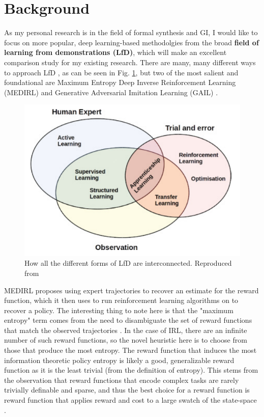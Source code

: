 \section{Background}

As my personal research is in the field of formal synthesis and GI, I would like to focus on more popular, deep learning-based methodolgies from the broad \textbf{field of learning from demonstrations (LfD)}, which will make an excellent comparison study for my existing research. There are many, many different ways to approach LfD \cite{Ravichandar2020}, as can be seen in Fig. \ref{fig: lfd_venn}, but two of the most salient and foundational are Maximum Entropy Deep Inverse Reinforcement Learning (MEDIRL) \cite{Wulfmeier2015MaximumED} and Generative Adversarial Imitation Learning (GAIL) \cite{Ho2016GenerativeAI}.

\begin{figure}[htbp]
\centerline{\includegraphics[width=\linewidth]{Figures/lfd_venn_diagram.png}}
\caption{How all the different forms of LfD are interconnected. Reproduced from \cite{Hussein2017}}
\label{fig: lfd_venn}
\end{figure}

MEDIRL proposes using expert trajectories to recover an estimate for the reward function, which it then uses to run reinforcement learning algorithms on to recover a policy. The interesting thing to note here is that the "maximum entropy" term comes from the need to disambiguate the set of reward functions that match the observed trajectories \cite{Wulfmeier2015MaximumED}. In the case of IRL, there are an infinite number of such reward functions, so the novel heuristic here is to choose from those that produce the most entropy. The reward function that induces the most information theoretic policy entropy is likely a good, generalizable reward function as it is the least trivial (from the definition of entropy). This stems from the observation that reward functions that encode complex tasks are rarely trivially definable and sparse, and thus the best choice for a reward function is reward function that applies reward and cost to a large swatch of the state-space \cite{Hussein2017}.

